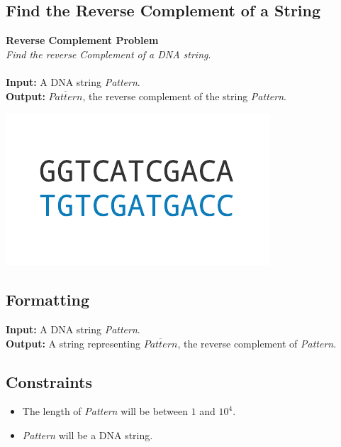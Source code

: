 \documentclass{article}
\begin{document}
\subsection{Find the Reverse Complement of a String}
\hline\vspace{5}
\noindent \textbf{Reverse Complement Problem}\\
\emph{Find the reverse Complement of a DNA string}.\\ \\
\textbf{Input:} A DNA string \emph{Pattern}.\\
\textbf{Output:} $\overline{Pattern}$, the reverse complement of the string \emph{Pattern}.
\begin{center}
    \includegraphics[scale=0.32]{c1/logos/1C.png} 
\end{center}
\hline\vspace{5}

\subsection*{Formatting}
\textbf{Input:} A DNA string \emph{Pattern}.\\
\noindent \textbf{Output:} A string representing $\overline{Pattern}$, the reverse complement of \emph{Pattern}.

\subsection*{Constraints}
\begin{itemize}
    \item The length of \emph{Pattern} will be between $1$ and $10^4$.
    \item \emph{Pattern} will be a DNA string.
\end{itemize}
\pagebreak
\end{document}
